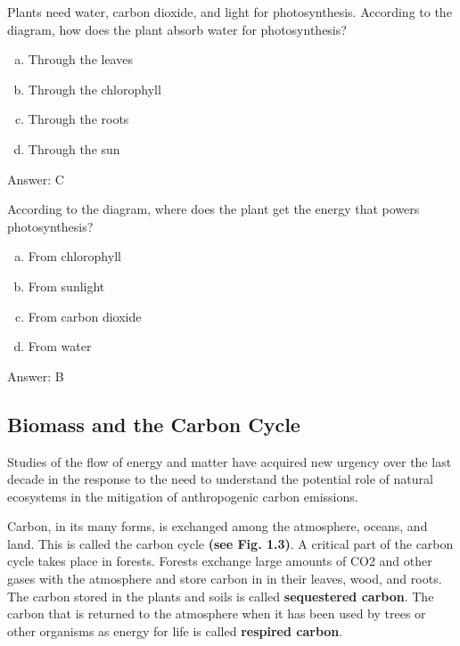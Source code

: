 \begin{problem}
  Plants need water, carbon dioxide, and light for photosynthesis. According to the diagram, how does the plant absorb water for photosynthesis? 
\begin{enumerate}[(a)]
    \item Through the leaves
    \item Through the chlorophyll
    \item Through the roots
    \item Through the sun
\end{enumerate}  


\end{problem}

Answer: C

\begin{problem}
According to the diagram, where does the plant get the energy that powers photosynthesis?
\begin{enumerate}[(a)]
\item From chlorophyll
\item From sunlight
\item From carbon dioxide
\item From water
\end{enumerate}  

Answer: B
\end{problem}

\subsection{Biomass and the Carbon Cycle}

Studies of the flow of energy and matter have acquired new urgency over the last decade in the response to the need to understand the potential role of natural ecosystems in the mitigation of anthropogenic carbon emissions.

   Carbon, in its many forms, is exchanged among the atmosphere, oceans, and land. This is called the carbon cycle \textbf{(see Fig. 1.3)}. A critical part of the carbon cycle takes place in forests. Forests exchange large amounts of CO2 and other gases with the atmosphere and store carbon in in their leaves, wood, and roots. The carbon stored in the plants and soils is called \textbf{sequestered carbon}. The carbon that is returned to the atmosphere when it has been used by trees or other organisms as energy for life is called \textbf{respired carbon}. 
  
